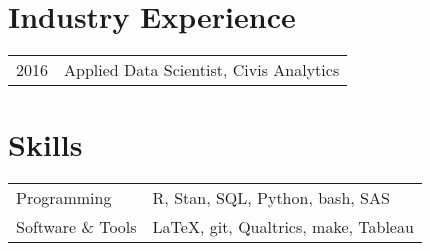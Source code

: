 \documentclass[12pt]{article}
\begin{document}
\section*{Industry Experience}
\label{sec:industry_experience}
\begin{tabular}{p{\datecolumn} l}
2016\textendash18 & Applied Data Scientist, Civis Analytics
\end{tabular}

\section*{Skills}
\label{sec:skills}
\begin{tabular}{l l}
Programming       & R, Stan, SQL, Python, bash, SAS \\
Software \& Tools & \LaTeX, git, Qualtrics, make, Tableau
\end{tabular}
\end{document}
